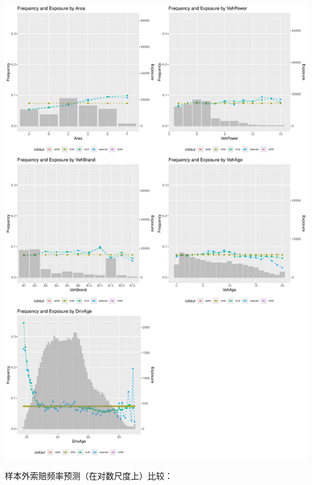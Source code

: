\documentclass[
]{article}
\begin{document}
\includegraphics{freMTPLfreq_fnn-zh-cn_files/figure-latex/unnamed-chunk-70-1.pdf}

样本外索赔频率预测（在对数尺度上）比较：
\end{document}
